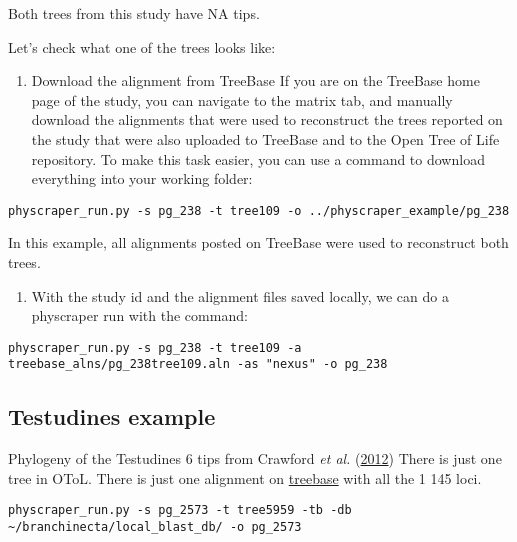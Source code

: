 \documentclass[]{article}
\providecommand{\tightlist}{%
  \setlength{\itemsep}{0pt}\setlength{\parskip}{0pt}}
\begin{document}
Both trees from this study have NA tips.

Let's check what one of the trees looks like:

\begin{enumerate}
\def\labelenumi{\arabic{enumi}.}
\tightlist
\item
  Download the alignment from TreeBase
  If you are on the TreeBase home page of the study, you can navigate to the matrix tab, and manually download the alignments that were used to reconstruct the trees reported on the study that were also uploaded to TreeBase and to the Open Tree of Life repository.
  To make this task easier, you can use a command to download everything into your working folder:
\end{enumerate}

\begin{verbatim}
physcraper_run.py -s pg_238 -t tree109 -o ../physcraper_example/pg_238
\end{verbatim}

In this example, all alignments posted on TreeBase were used to reconstruct both trees.

\begin{enumerate}
\def\labelenumi{\arabic{enumi}.}
\tightlist
\item
  With the study id and the alignment files saved locally, we can do a physcraper run with the command:
\end{enumerate}

\begin{verbatim}
physcraper_run.py -s pg_238 -t tree109 -a treebase_alns/pg_238tree109.aln -as "nexus" -o pg_238
\end{verbatim}

\hypertarget{testudines-example}{%
\subsection{Testudines example}\label{testudines-example}}

Phylogeny of the Testudines 6 tips from Crawford \emph{et al.} (\protect\hyperlink{ref-crawford2012more}{2012})
There is just one tree in OToL.
There is just one alignment on \href{https://treebase.org/treebase-web/search/study/matrices.html?id=12742}{treebase} with all the 1 145 loci.

\begin{verbatim}
physcraper_run.py -s pg_2573 -t tree5959 -tb -db ~/branchinecta/local_blast_db/ -o pg_2573
\end{verbatim}
\end{document}
